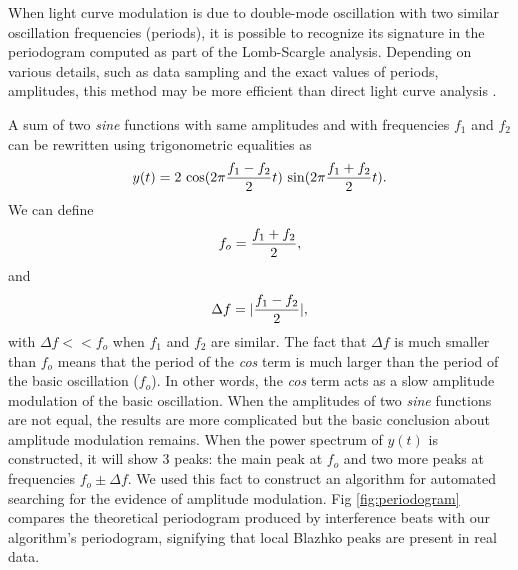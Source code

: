   
When light curve modulation is due to double-mode oscillation with two similar oscillation frequencies (periods),
it is possible to recognize its signature in the periodogram computed as part of the Lomb-Scargle analysis. Depending
on various details, such as data sampling and the exact values of periods, amplitudes, this method may be
more efficient than direct light curve analysis \citep{2020MNRAS.494.1237S}. 

A sum of two {\it sine} functions with same amplitudes and with frequencies $f_1$ and $f_2$ can be rewritten 
using trigonometric equalities as 
\begin{equation}
         y(t) = 2 \, \cos(2\pi{f_1-f_2\over 2} t) \, \sin(2\pi {f_1+f_2\over 2} t).
\end{equation} 
We can define 
\begin{equation}
\label{eq:fo}
         f_o = {f_1+f_2\over 2},
\end{equation} 
and 
\begin{equation}
\label{eq:Df}
         \Delta f = |{f_1-f_2\over 2}|,
\end{equation} 
with $\Delta f << f_o$ when $f_1$ and $f_2$ are similar. The fact that $\Delta f$ is much smaller than $f_o$ means
that the period of the {\it cos} term
is much larger than the period of the basic oscillation ($f_o$). In other words, the {\it cos} term acts as a slow
amplitude modulation of the basic oscillation. When the amplitudes of two {\it sine} functions are not equal, the
results are more complicated but the basic conclusion about amplitude modulation remains.
When the power spectrum of $y(t)$ is constructed, it will show 3 peaks: the main peak at $f_o$ and
two more peaks at frequencies $f_o \pm \Delta f$. We used this fact to construct an algorithm for
automated searching for the evidence of amplitude  modulation. 
Fig \ref{fig:periodogram} compares the theoretical periodogram produced by interference beats with our algorithm's periodogram,
signifying that local Blazhko peaks are present in real data.


